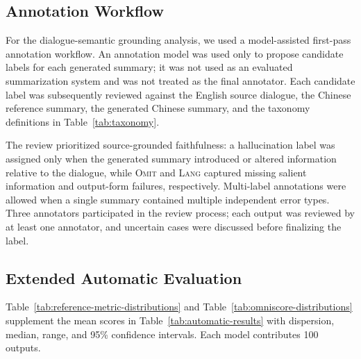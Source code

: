 \documentclass[11pt]{article}
\begin{document}
\FloatBarrier

\subsection{Annotation Workflow}
\label{sec:appendix-annotation-workflow}

For the dialogue-semantic grounding analysis, we used a model-assisted first-pass annotation workflow. An annotation model was used only to propose candidate labels for each generated summary; it was not used as an evaluated summarization system and was not treated as the final annotator. Each candidate label was subsequently reviewed against the English source dialogue, the Chinese reference summary, the generated Chinese summary, and the taxonomy definitions in Table~\ref{tab:taxonomy}.

The review prioritized source-grounded faithfulness: a hallucination label was assigned only when the generated summary introduced or altered information relative to the dialogue, while \textsc{Omit} and \textsc{Lang} captured missing salient information and output-form failures, respectively. Multi-label annotations were allowed when a single summary contained multiple independent error types. Three annotators participated in the review process; each output was reviewed by at least one annotator, and uncertain cases were discussed before finalizing the label.

\FloatBarrier

\subsection{Extended Automatic Evaluation}
\label{sec:appendix-extended-eval}

Table~\ref{tab:reference-metric-distributions} and Table~\ref{tab:omniscore-distributions} supplement the mean scores in Table~\ref{tab:automatic-results} with dispersion, median, range, and 95\% confidence intervals. Each model contributes 100 outputs.
\end{document}
